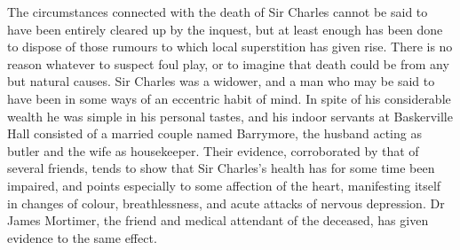 \documentclass[paper=a5,BCOR=7mm,twoside,DIV=calc,12pt,usegeometry,openany,chapterprefix,endperiod,headings=big]{scrbook} %
\begin{document}
\textsf{The circumstances connected with the death of Sir Charles cannot be said to have been entirely cleared up by the inquest, but at least enough has been done to dispose of those rumours to which local superstition has given rise. There is no reason whatever to suspect foul play, or to imagine that death could be from any but natural causes. Sir Charles was a widower, and a man who may be said to have been in some ways of an eccentric habit of mind. In spite of his considerable wealth he was simple in his personal tastes, and his indoor servants at Baskerville Hall consisted of a married couple named Barrymore, the husband acting as butler and the wife as housekeeper. Their evidence, corroborated by that of several friends, tends to show that Sir Charles's health has for some time been impaired, and points especially to some affection of the heart, manifesting itself in changes of colour, breathlessness, and acute attacks of nervous depression. Dr James Mortimer, the friend and medical attendant of the deceased, has given evidence to the same effect.}
\end{document}
